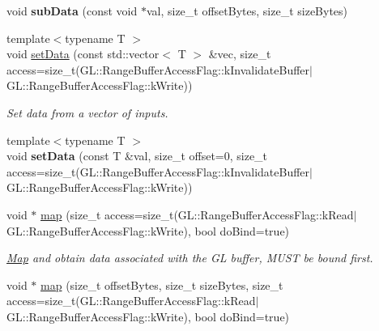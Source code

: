 \begin{Indent}
\begin{DoxyCompactItemize}
\item 
\mbox{\label{classrev_1_1_g_l_buffer_a95f11214467a384d13843d7f55a6d591}} 
void {\bfseries sub\+Data} (const void $\ast$val, size\+\_\+t offset\+Bytes, size\+\_\+t size\+Bytes)
\item 
{\footnotesize template$<$typename T $>$ }\\void \mbox{\hyperlink{classrev_1_1_g_l_buffer_a1b72e5c274dbe688738533bad385d176}{set\+Data}} (const std\+::vector$<$ T $>$ \&vec, size\+\_\+t access=size\+\_\+t(G\+L\+::\+Range\+Buffer\+Access\+Flag\+::k\+Invalidate\+Buffer$\vert$G\+L\+::\+Range\+Buffer\+Access\+Flag\+::k\+Write))
\begin{DoxyCompactList}\small\item\em Set data from a vector of inputs. \end{DoxyCompactList}\item 
\mbox{\label{classrev_1_1_g_l_buffer_ad1358202edb1ece3bc1c31be07941016}} 
{\footnotesize template$<$typename T $>$ }\\void {\bfseries set\+Data} (const T \&val, size\+\_\+t offset=0, size\+\_\+t access=size\+\_\+t(G\+L\+::\+Range\+Buffer\+Access\+Flag\+::k\+Invalidate\+Buffer$\vert$G\+L\+::\+Range\+Buffer\+Access\+Flag\+::k\+Write))
\item 
\mbox{\label{classrev_1_1_g_l_buffer_a3ac801e5d41dace8304e7f50408c8ff9}} 
void $\ast$ \mbox{\hyperlink{classrev_1_1_g_l_buffer_a3ac801e5d41dace8304e7f50408c8ff9}{map}} (size\+\_\+t access=size\+\_\+t(G\+L\+::\+Range\+Buffer\+Access\+Flag\+::k\+Read$\vert$G\+L\+::\+Range\+Buffer\+Access\+Flag\+::k\+Write), bool do\+Bind=true)
\begin{DoxyCompactList}\small\item\em \mbox{\hyperlink{classrev_1_1_map}{Map}} and obtain data associated with the GL buffer, M\+U\+ST be bound first. \end{DoxyCompactList}\item 
void $\ast$ \mbox{\hyperlink{classrev_1_1_g_l_buffer_a36308de451b296fcb41db56e407a209d}{map}} (size\+\_\+t offset\+Bytes, size\+\_\+t size\+Bytes, size\+\_\+t access=size\+\_\+t(G\+L\+::\+Range\+Buffer\+Access\+Flag\+::k\+Read$\vert$G\+L\+::\+Range\+Buffer\+Access\+Flag\+::k\+Write), bool do\+Bind=true)
\item 
\mbox{\label{classrev_1_1_g_l_buffer_aa7c883e14d30a613d2716667d7f80d72}} 

\end{DoxyCompactItemize}
\end{Indent}

